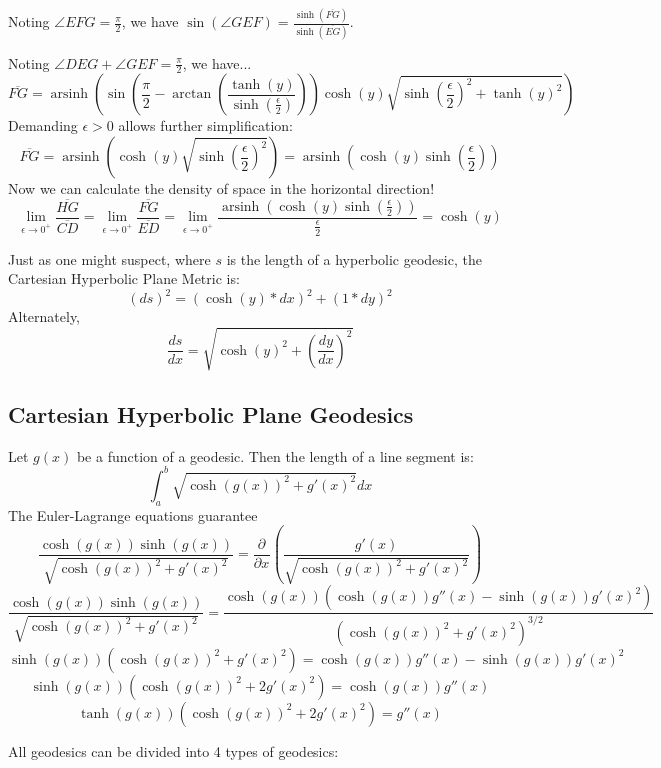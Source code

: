 \documentclass[]{article}
\DeclareMathOperator{\arsinh}{arsinh}
\newcommand{\pqty}[1]{{\left(#1\right)}}
\newcommand{\pdiff}[2]{\frac{\partial^{#2}}{\partial #1^{#2}}}
\numberwithin{equation}{section}
\begin{document}
	Noting $\angle{EFG}=\frac{\pi}{2}$, we have $\sin\pqty{\angle{GEF}}=\frac{\sinh\pqty{\overline{FG}}}{\sinh\pqty{\overline{EG}}}$.
	
	Noting $\angle{DEG}+\angle{GEF}=\frac{\pi}{2}$, we have...
	$$\overline{FG} = \arsinh\pqty{
		\sin\pqty{\frac{\pi}{2}-\arctan\pqty{\frac{\tanh\pqty{y}}{\sinh\pqty{\frac{\epsilon}{2}}}}}
		\cosh\pqty{y}
		\sqrt{\sinh\pqty{\frac{\epsilon}{2}}^2+\tanh\pqty{y}^2}
	}$$
	Demanding $\epsilon>0$ allows further simplification:
	$$\overline{FG} = \arsinh\pqty{
		\cosh\pqty{y}
		\sqrt{\sinh\pqty{\frac{\epsilon}{2}}^2}
	} = \arsinh\pqty{
		\cosh\pqty{y}
		\sinh\pqty{\frac{\epsilon}{2}}
	}$$
	Now we can calculate the density of space in the horizontal direction!
	$$
	\lim\limits_{\epsilon\to 0^+}\frac{\overline{HG}}{\overline{CD}}=
	\lim\limits_{\epsilon\to 0^+}\frac{\overline{FG}}{\overline{ED}}=
	\lim\limits_{\epsilon\to 0^+}\frac{\arsinh\pqty{
			\cosh\pqty{y}
			\sinh\pqty{\frac{\epsilon}{2}}
	}}{\frac{\epsilon}{2}}
	=\cosh\pqty{y}
	$$
	
	Just as one might suspect, where $s$ is the length of a hyperbolic geodesic, the Cartesian Hyperbolic Plane Metric is:
	$$\pqty{ds}^2=\pqty{\cosh\pqty{y}*dx}^2+\pqty{1*dy}^2$$
	Alternately,
	$$\frac{ds}{dx}=\sqrt{\cosh\pqty{y}^2+\pqty{\frac{dy}{dx}}^2}$$
	
	\subsection{Cartesian Hyperbolic Plane Geodesics}
	Let $g\pqty{x}$ be a function of a geodesic. Then the length of a line segment is:
	$$\int_{a}^{b}\sqrt{\cosh\pqty{g\pqty{x}}^2+g'\pqty{x}^2}dx$$
	The Euler-Lagrange equations guarantee
	$$\frac{\cosh\pqty{g\pqty{x}}\sinh\pqty{g\pqty{x}}}{\sqrt{\cosh\pqty{g\pqty{x}}^2+g'\pqty{x}^2}}
	=\pdiff{x}{}\pqty{\frac{g'\pqty{x}}{\sqrt{\cosh\pqty{g\pqty{x}}^2+g'\pqty{x}^2}}}
	$$
	$$\frac{\cosh\pqty{g\pqty{x}}\sinh\pqty{g\pqty{x}}}{\sqrt{\cosh\pqty{g\pqty{x}}^2+g'\pqty{x}^2}}
	=\frac{\cosh\pqty{g\pqty{x}}\pqty{\cosh\pqty{g\pqty{x}}g''\pqty{x}-\sinh\pqty{g\pqty{x}}g'\pqty{x}^2}}
	{\pqty{\cosh\pqty{g\pqty{x}}^2+g'\pqty{x}^2}^{3/2}}
	$$
	$$\sinh\pqty{g\pqty{x}}\pqty{\cosh\pqty{g\pqty{x}}^2+g'\pqty{x}^2}
	=\cosh\pqty{g\pqty{x}}g''\pqty{x}-\sinh\pqty{g\pqty{x}}g'\pqty{x}^2
	$$
	$$\sinh\pqty{g\pqty{x}}\pqty{\cosh\pqty{g\pqty{x}}^2+2g'\pqty{x}^2}
	=\cosh\pqty{g\pqty{x}}g''\pqty{x}
	$$
	$$\tanh\pqty{g\pqty{x}}\pqty{\cosh\pqty{g\pqty{x}}^2+2g'\pqty{x}^2}=g''\pqty{x}$$
	
	All geodesics can be divided into 4 types of geodesics:
	
\end{document}
